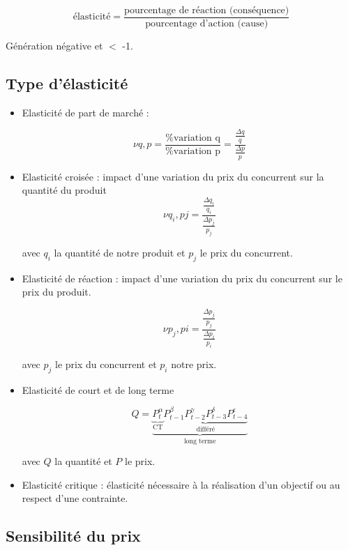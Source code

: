 		$$\text{élasticité} = \frac{\text{pourcentage de réaction (conséquence)}}{\text{pourcentage d'action (cause)}} $$
		
		Génération négative et $<$ -1.
		
		\subsection{Type d'élasticité}
		
		\begin{itemize}
			\item Elasticité de part de marché :
			
			$$\nu q, p = \frac{ \text{\% variation q} }{\text{\% variation p}} = \frac{ \frac{\Delta q}{q} }{ \frac{\Delta p}{p} }$$
			
			\item Elasticité croisée : impact d'une variation du prix du concurrent sur la quantité du produit
				$$\nu q_i, pj =  \frac{ \frac{\Delta q_i}{q_i} }{ \frac{\Delta p_j}{p_j} }$$
				
				avec $q_i$ la quantité de notre produit et $p_j$ le prix du concurrent.
				
			\item Elasticité de réaction : impact d'une variation du prix du concurrent  sur le prix du produit.
			
			$$\nu p_j, pi =  \frac{ \frac{\Delta p_j}{p_j} }{ \frac{\Delta p_i}{p_i} }$$
				
				avec $p_j$ le prix du concurrent et $p_i$ notre prix.
				
				
				
			\item Elasticité de court et de long terme
			
			$$Q = \underbrace{\underbrace{P_t^\alpha}_{\text{CT}} \underbrace{P_{t - 1}^\beta P_{t - 2}^\gamma P_{t - 3}^\delta P_{t - 4}^\epsilon}_{\text{différé}}}_{\text{long terme}}$$
			
			avec $Q$ la quantité et $P$ le prix.
			
			\item Elasticité critique : élasticité nécessaire à la réalisation d'un objectif ou au respect d'une contrainte.
		\end{itemize}
		
		
		
		\subsection{Sensibilité du prix}
		
